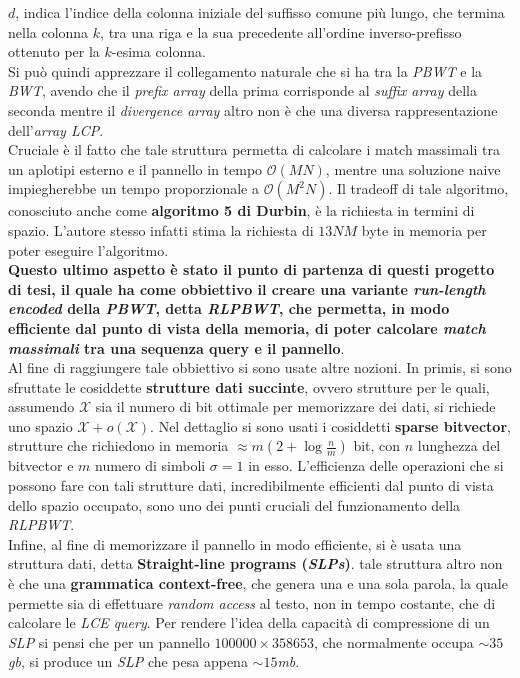 \documentclass[a4paper,11pt, oneside]{article}
\begin{document}
$d$, indica l'indice della colonna iniziale del suffisso comune più lungo, che
termina nella colonna $k$, tra una riga e la sua precedente all'ordine
inverso-prefisso ottenuto per la $k$-esima colonna. \\
Si può quindi apprezzare il collegamento naturale che si ha tra la \textit{PBWT}
e la \textit{BWT}, avendo che il \textit{prefix array} della prima corrisponde
al \textit{suffix array} della seconda mentre il \textit{divergence array} altro
non è che una diversa rappresentazione dell'\textit{array LCP}. \\
Cruciale è il fatto che tale struttura permetta di calcolare i match massimali
tra un aplotipi esterno e il pannello in tempo $\mathcal{O}(MN)$, mentre una
soluzione naive impiegherebbe un tempo proporzionale a $\mathcal{O}(M^2N)$. Il
tradeoff di tale algoritmo, conosciuto anche come \textbf{algoritmo 5 di
  Durbin}, è la richiesta in termini di spazio. L'autore stesso infatti stima la
richiesta di $13NM$ byte in memoria per poter eseguire l'algoritmo.\\
\textbf{Questo ultimo aspetto è stato il punto di partenza di questi progetto di
tesi, il quale ha come obbiettivo il creare una variante \textit{run-length
  encoded} della \textit{PBWT}, detta \textit{RLPBWT}, che permetta, in modo
efficiente dal punto di vista della memoria, di poter calcolare \textit{match
  massimali} tra una sequenza query e il pannello}.\\
Al fine di raggiungere tale obbiettivo si sono usate altre nozioni. In primis,
si sono sfruttate le cosiddette \textbf{strutture dati succinte}, ovvero
strutture per le quali, assumendo $\mathcal{X}$ sia il numero di bit ottimale
per memorizzare dei dati, si richiede uno spazio
$\mathcal{X}+o(\mathcal{X})$. Nel dettaglio si sono usati i cosiddetti
\textbf{sparse bitvector}, strutture che richiedono in memoria $\approx
m\left(2+\log\frac{n}{m}\right)$ bit, con $n$ lunghezza del bitvector e $m$
numero di simboli $\sigma=1$ in esso. L'efficienza delle operazioni che si
possono fare con tali strutture dati, incredibilmente efficienti dal punto di
vista dello spazio occupato, sono uno dei punti cruciali del funzionamento della
\textit{RLPBWT}.\\
Infine, al fine di memorizzare il pannello in modo efficiente, si è usata una
struttura dati, detta \textbf{Straight-line programs (\textit{SLPs})}. tale
struttura altro non è che una \textbf{grammatica context-free}, che
genera una e una sola parola, la quale permette sia di effettuare \textit{random
access} al testo, non in tempo costante, che di calcolare le \textit{LCE
query}. Per rendere l'idea della capacità di compressione di un \textit{SLP} si
pensi che per un pannello $100000\times 358653$, che normalmente occupa $\sim
35$\textit{gb}, si produce un \textit{SLP} che pesa appena $\sim 15$\textit{mb}.
\end{document}
